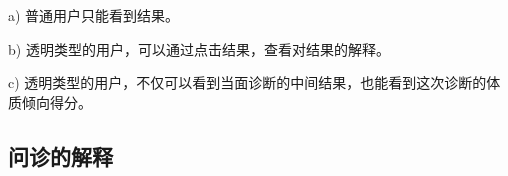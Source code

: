a) 普通用户只能看到结果。

b) 透明类型的用户，可以通过点击结果，查看对结果的解释。

c) 透明类型的用户，不仅可以看到当面诊断的中间结果，也能看到这次诊断的体质倾向得分。



\subsection{问诊的解释}

\begin{figure}
    \centering

\end{figure}
